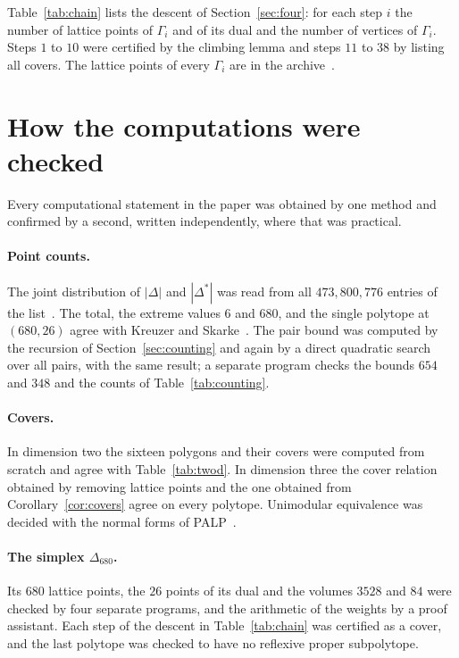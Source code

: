 \documentclass[11pt]{amsart}
\theoremstyle{definition}
\theoremstyle{remark}
\newcommand{\Dbig}{\Delta_{680}}
\begin{document}
Table~\ref{tab:chain} lists the descent of Section~\ref{sec:four}: for each
step $i$ the number of lattice points of $\Gamma_i$ and of its dual and the
number of vertices of $\Gamma_i$. Steps $1$ to $10$ were certified by the
climbing lemma and steps $11$ to $38$ by listing all covers. The lattice
points of every $\Gamma_i$ are in the archive~\cite{Repo}.

\section{How the computations were checked}\label{app:checks}

Every computational statement in the paper was obtained by one method and
confirmed by a second, written independently, where that was practical.

\paragraph*{Point counts.} The joint distribution of $|\Delta|$ and
$|\Delta^*|$ was read from all $473{,}800{,}776$ entries of the
list~\cite{HF4D}. The total, the extreme values $6$ and $680$, and the
single polytope at $(680,26)$ agree with Kreuzer and Skarke~\cite{KS00}.
The pair bound was computed by the recursion of Section~\ref{sec:counting}
and again by a direct quadratic search over all pairs, with the same
result; a separate program checks the bounds $654$ and $348$ and the
counts of Table~\ref{tab:counting}.

\paragraph*{Covers.} In dimension two the sixteen polygons and their
covers were computed from scratch and agree with Table~\ref{tab:twod}. In
dimension three the cover relation obtained by removing lattice points and
the one obtained from Corollary~\ref{cor:covers} agree on every polytope.
Unimodular equivalence was decided with the normal forms of
PALP~\cite{KS04}.

\paragraph*{The simplex $\Dbig$.} Its $680$ lattice points, the $26$ points
of its dual and the volumes $3528$ and $84$ were checked by four separate
programs, and the arithmetic of the weights by a proof assistant. Each
step of the descent in Table~\ref{tab:chain} was certified as a cover, and
the last polytope was checked to have no reflexive proper subpolytope.
\end{document}
